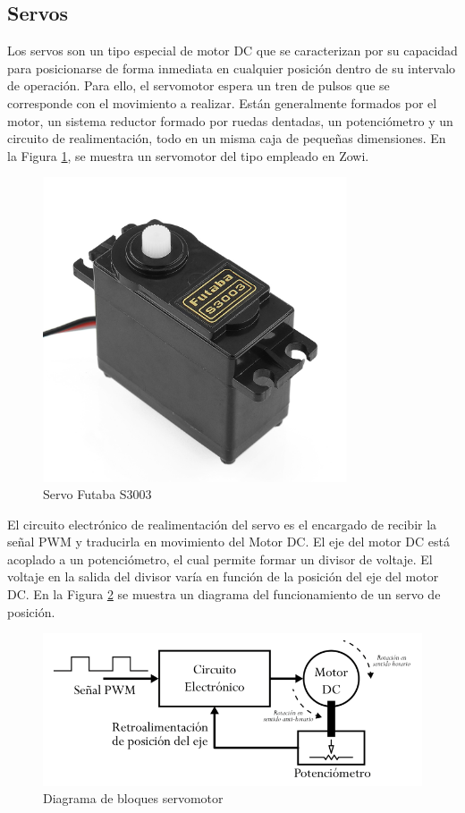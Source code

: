 \subsection{Servos}
Los servos son un tipo especial de motor DC que se caracterizan por su capacidad para posicionarse de forma inmediata en cualquier posición dentro de su intervalo de operación. Para ello, el servomotor espera un tren de pulsos que se corresponde con el movimiento a realizar. Están generalmente formados por el motor, un sistema reductor formado por ruedas dentadas, un potenciómetro y un circuito de realimentación, todo en un misma caja de pequeñas dimensiones. En la Figura \ref{fig:futaba}, se muestra un servomotor del tipo empleado en Zowi.

\begin{figure}[h]
\centering
\includegraphics[width=90mm]{Figures/futaba.png}
\caption[Servo Futaba S3003]{Servo Futaba S3003}
\label{fig:futaba}
\end{figure}

El circuito electrónico de realimentación del servo es el encargado de recibir la señal PWM y traducirla en movimiento del Motor DC. El eje del motor DC está acoplado a un potenciómetro, el cual permite formar un divisor de voltaje. El voltaje en la salida del divisor varía en función de la posición del eje del motor DC. En la Figura \ref{fig:ServoDiag} se muestra un diagrama del funcionamiento de un servo de posición.

\begin{figure}[h]
\centering
\includegraphics[width=140mm]{Figures/servo-diag.png}
\caption[Diagrama de bloques servomotor]{Diagrama de bloques servomotor}
\label{fig:ServoDiag}
\end{figure}


